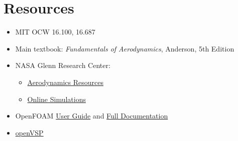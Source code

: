 \documentclass[12pt]{article}
\begin{document}
	\section{Resources}
		\begin{itemize}
			\item MIT OCW 16.100, 16.687
			\item Main textbook: \textit{Fundamentals of Aerodynamics}, Anderson, 5th Edition
			\item NASA Glenn Research Center: 
			\begin{itemize}
				\item \href{https://www.grc.nasa.gov/www/k-12/airplane/short.html}{Aerodynamics Resources}
				\item \href{https://www.grc.nasa.gov/www/k-12/UndergradProgs/index.htm}{Online Simulations}
			\end{itemize}
			\item OpenFOAM \href{https://cfd.direct/openfoam/user-guide/}{User Guide} and \href{https://cfd.direct/openfoam/documentation/}{Full Documentation}
			\item \href{http://openvsp.org/}{openVSP}
		\end{itemize}
\end{document}
